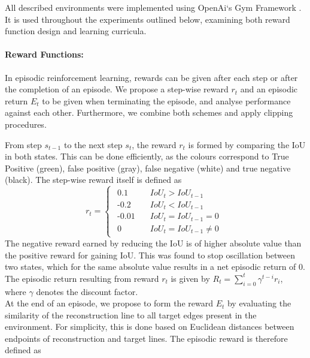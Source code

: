 \documentclass[11pt]{article} %
\begin{document}
All described environments were implemented using OpenAi`s Gym Framework \cite{gym}.
It is used throughout the experiments outlined below, examining both reward function design and learning curricula.
\paragraph{Reward Functions:}
In episodic reinforcement learning, rewards can be given after each step or after the completion of an episode. 
We propose a step-wise reward $r_t$ and an episodic return $E_t$ to be given when terminating the episode, and analyse performance against each other.
Furthermore, we combine both schemes and apply clipping procedures.

From step $s_{t-1}$ to the next step $s_{t}$, the reward $r_t$ is formed by comparing the IoU in both states.
This can be done efficiently, as the colours correspond to True Positive (green), false positive (gray), false negative (white) and true negative (black).
The step-wise reward itself is defined as
\begin{equation}
    r_t = \begin{cases}
    \begin{aligned}
    0.1 & \quad IoU_t > IoU_{t-1} \\
    \text{-}0.2 & \quad IoU_t < IoU_{t-1} \\
    \text{-}0.01 & \quad IoU_t = IoU_{t-1} = 0 \\
    0 & \quad IoU_t = IoU_{t-1} \neq 0
    \end{aligned}
    \end{cases}
    \label{eq:methods-env-rew-stepreward}
\end{equation}
The negative reward earned by reducing the IoU is of higher absolute value than the positive reward for gaining IoU.
This was found to stop oscillation between two states, which for the same absolute value results in a net episodic return of 0. The episodic return resulting from reward $r_t$ is given by $R_t = \sum_{i=0}^{t}{\gamma^{t-i} r_i}$, where $\gamma$ denotes the discount factor.\\ 
At the end of an episode, we propose to form the reward $E_t$ by evaluating the similarity of the reconstruction line to all target edges present in the environment. For simplicity, this is done based on Euclidean distances between endpoints of reconstruction and target lines.
The episodic reward is therefore defined as
\end{document}
